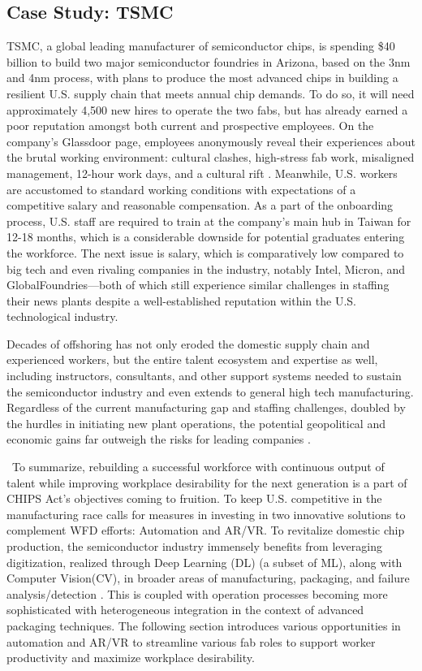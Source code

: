 \subsection{Case Study: TSMC}\label{sec5_1:tsmc}
TSMC, a global leading manufacturer of semiconductor chips, is spending \$40 billion to build two major semiconductor foundries in Arizona, based on the 3nm and 4nm process, with plans to produce the most advanced chips in building a resilient U.S. supply chain that meets annual chip demands. To do so, it will need approximately 4,500 new hires to operate the two fabs, but has already earned a poor reputation amongst both current and prospective employees. On the company’s Glassdoor page, employees anonymously reveal their experiences about the brutal working environment: cultural clashes, high-stress fab work, misaligned management, 12-hour work days, and a cultural rift \cite{Lau2023-du}. Meanwhile, U.S. workers are accustomed to standard working conditions with expectations of a competitive salary and reasonable compensation. As a part of the onboarding process, U.S. staff are required to train at the company’s main hub in Taiwan for 12-18 months, which is a considerable downside for potential graduates entering the workforce. The next issue is salary, which is comparatively low compared to big tech and even rivaling companies in the industry, notably Intel, Micron, and GlobalFoundries—both of which still experience similar challenges in staffing their news plants despite a well-established reputation within the U.S. technological industry. 

Decades of offshoring has not only eroded the domestic supply chain and experienced workers, but the entire talent ecosystem and expertise as well, including instructors, consultants, and other support systems needed to sustain the semiconductor industry and even extends to general high tech manufacturing. Regardless of the current manufacturing gap and staffing challenges, doubled by the hurdles in initiating new plant operations, the potential geopolitical and economic gains far outweigh the risks for leading companies \cite{Lau2023-du}. 

\ To summarize, rebuilding a successful workforce with continuous output of talent while improving workplace desirability for the next generation is a part of CHIPS Act’s objectives coming to fruition. To keep U.S. competitive in the manufacturing race calls for measures in investing in two innovative solutions to complement WFD efforts: Automation and AR/VR. To revitalize domestic chip production, the semiconductor industry immensely benefits from leveraging digitization, realized through Deep Learning (DL) (a subset of ML), along with Computer Vision(CV), in broader areas of manufacturing, packaging, and failure analysis/detection \cite{Lee2021-lo, Nakazawa2019-ki, Kim2020-pw, Batool2021-yv, Lu2022-mt, Adly2014-nk, Hsu2021-qt, Ma2019-tv, Richter2019-pg, Ghosh2021-lg, cryptoeprint:2022/924, Asadizanjani2017-xe}. This is coupled with operation processes becoming more sophisticated with heterogeneous integration in the context of advanced packaging techniques. The following section introduces various opportunities in automation and AR/VR to streamline various fab roles to support worker productivity and maximize workplace desirability.


